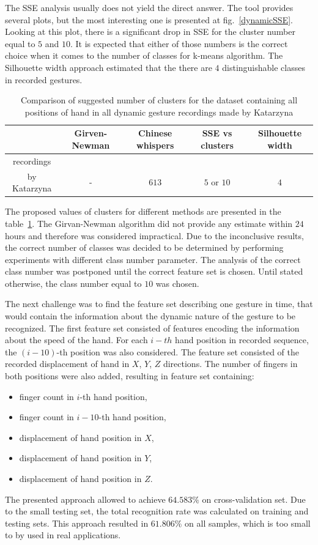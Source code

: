 The SSE analysis usually does not yield the direct answer.
The tool provides several plots, but the most interesting one is presented at fig.~\ref{dynamicSSE}. 
Looking at this plot, there is a significant drop in SSE for the cluster number equal to $5$ and $10$.
It is expected that either of those numbers is the correct choice when it comes to the number of classes for k-means algorithm.
The Silhouette width approach estimated that the there are $4$ distinguishable classes in recorded gestures.


\begin{table}[ht]
 \caption{Comparison of suggested number of clusters for the dataset containing all positions of hand in all dynamic gesture recordings made by Katarzyna}
 \label{clusterwyn}
    \begin{tabular}{ccccc}
    \hline
     & Girven-Newman & Chinese whispers   & SSE vs clusters & Silhouette width  \\ \hline
    recordings \\by Katarzyna          & -      & $613$ & $5$ or $10$     & $4$     \\ \hline
    \end{tabular}
\end{table}

The proposed values of clusters for different methods are presented in the table~\ref{clusterwyn}.
The Girvan-Newman algorithm did not provide any estimate within $24$ hours and therefore was considered impractical.
Due to the inconclusive results, the correct number of classes was decided to be determined by performing experiments with different class number parameter.
The analysis of the correct class number was postponed until the correct feature set is chosen.
Until stated otherwise, the class number equal to $10$ was chosen.

The next challenge was to find the feature set describing one gesture in time, that would contain the information about the dynamic nature of the gesture to be recognized. 
The first feature set consisted of features encoding the information about the speed of the hand. For each $i-th$ hand position in recorded sequence, the $(i-10)$-th position was also considered. 
The feature set consisted of the recorded displacement of hand in $X$, $Y$, $Z$ directions.
The number of fingers in both positions were also added, resulting in feature set containing:
\begin{itemize}
\item finger count in $i$-th hand position,
\item finger count in $i-10$-th hand position,
\item displacement of hand position in $X$,
\item displacement of hand position in $Y$,
\item displacement of hand position in $Z$.
\end{itemize}
The presented approach allowed to achieve $64.583\%$ on cross-validation set. 
Due to the small testing set, the total recognition rate was calculated on training and testing sets.
This approach resulted in $61.806\%$ on all samples, which is too small to by used in real applications.

